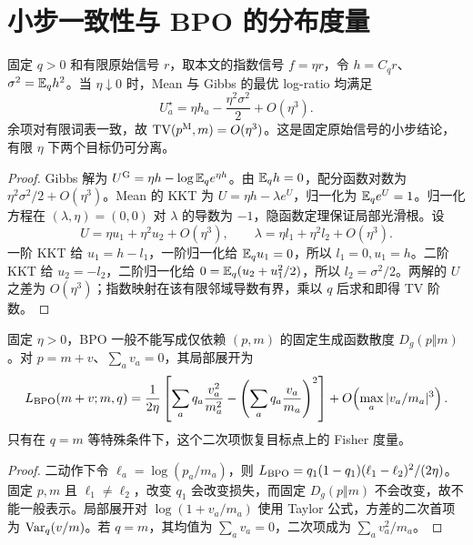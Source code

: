 \section{小步一致性与 BPO 的分布度量}
\begin{proposition}
\label{prop:small-step-mean}
固定 $q>0$ 和有限原始信号 $r$，取本文的指数信号 $f=\eta r$，令 $h=C_qr$、$\sigma^2=\mathbb E_qh^2$。当 $\eta\downarrow0$ 时，Mean 与 Gibbs 的最优 log-ratio 均满足
\begin{equation}
U_a^\star=\eta h_a-\frac{\eta^2\sigma^2}{2}+O(\eta^3).
\end{equation}
余项对有限词表一致，故 $\operatorname{TV}(p^{\rm M},m)=O(\eta^3)$。这是固定原始信号的小步结论，有限 $\eta$ 下两个目标仍可分离。
\end{proposition}
\begin{proof}
Gibbs 解为 $U^{\rm G}=\eta h-\log\mathbb E_qe^{\eta h}$。由 $\mathbb E_qh=0$，配分函数对数为 $\eta^2\sigma^2/2+O(\eta^3)$。Mean 的 KKT 为 $U=\eta h-\lambda e^U$，归一化为 $\mathbb E_qe^U=1$。归一化方程在 $(\lambda,\eta)=(0,0)$ 对 $\lambda$ 的导数为 $-1$，隐函数定理保证局部光滑根。设
\begin{equation}
U=\eta u_1+\eta^2u_2+O(\eta^3),\qquad
\lambda=\eta l_1+\eta^2l_2+O(\eta^3).
\end{equation}
一阶 KKT 给 $u_1=h-l_1$，一阶归一化给 $\mathbb E_qu_1=0$，所以 $l_1=0,u_1=h$。二阶 KKT 给 $u_2=-l_2$，二阶归一化给 $0=\mathbb E_q(u_2+u_1^2/2)$，所以 $l_2=\sigma^2/2$。两解的 $U$ 之差为 $O(\eta^3)$；指数映射在该有限邻域导数有界，乘以 $q$ 后求和即得 TV 阶数。
\end{proof}

\begin{proposition}
\label{prop:bpo-three-distributions}
固定 $\eta>0$，BPO 一般不能写成仅依赖 $(p,m)$ 的固定生成函数散度 $D_g(p\Vert m)$。对 $p=m+v$、$\sum_av_a=0$，其局部展开为
\begin{equation}
L_{\rm BPO}(m+v;m,q)=\frac1{2\eta}
\left[\sum_aq_a\frac{v_a^2}{m_a^2}
-\left(\sum_aq_a\frac{v_a}{m_a}\right)^2\right]
+O\!\left(\max_a|v_a/m_a|^3\right).
\end{equation}
只有在 $q=m$ 等特殊条件下，这个二次项恢复目标点上的 Fisher 度量。
\end{proposition}
\begin{proof}
二动作下令 $\ell_a=\log(p_a/m_a)$，则 $L_{\rm BPO}=q_1(1-q_1)(\ell_1-\ell_2)^2/(2\eta)$。固定 $p,m$ 且 $\ell_1\ne\ell_2$，改变 $q_1$ 会改变损失，而固定 $D_g(p\Vert m)$ 不会改变，故不能一般表示。局部展开对 $\log(1+v_a/m_a)$ 使用 Taylor 公式，方差的二次首项为 $\operatorname{Var}_q(v/m)$。若 $q=m$，其均值为 $\sum_av_a=0$，二次项成为 $\sum_av_a^2/m_a$。
\end{proof}

